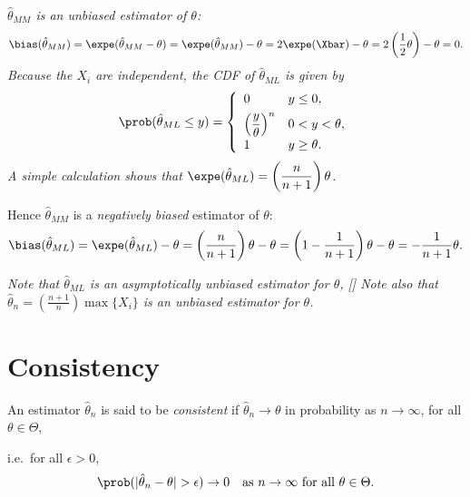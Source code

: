 \begin{solution}
\ben
\it $\hat{\theta}_{MM}$ is an \emph{unbiased} estimator of $\theta$:
\[
\bias(\hat{\theta}_{MM}) 
	= \expe(\hat{\theta}_{MM} - \theta)
	= \expe(\hat{\theta}_{MM}) - \theta
	= 2\expe(\Xbar) -\theta
	= 2\left(\frac{1}{2}\theta\right) - \theta
	= 0.
\]
\it Because the $X_i$ are independent, the CDF of $\hat{\theta}_{ML}$ is given by
\[
\prob(\hat{\theta}_{ML} \leq y) = \left\{\begin{array}{ll}
	0	& y \leq 0, \\[1ex]
	\displaystyle\left(\frac{y}{\theta}\right)^n & 0 < y < \theta, \\[1ex]
	1	& y \geq \theta.
\end{array}\right.
\]
A simple calculation shows that $\displaystyle\expe(\hat{\theta}_{ML}) = \left(\frac{n}{n+1}\right)\theta$.
\par
Hence $\hat{\theta}_{MM}$ is a \emph{negatively biased} estimator of $\theta$:
\[
\bias(\hat{\theta}_{ML}) 
	= \expe(\hat{\theta}_{ML}) - \theta
	= \left(\frac{n}{n+1}\right)\theta - \theta
	= \left(1-\frac{1}{n+1}\right)\theta - \theta
	= -\frac{1}{n+1}\theta.
\]

\bit
\it Note that $\hat{\theta}_{ML}$ is an \emph{asymptotically unbiased} estimator for $\theta$,
\it[]
\it Note also that $\hat{\theta}_n = \displaystyle\left(\frac{n+1}{n}\right)\max\{X_i\}$ is an unbiased estimator for $\theta$.
\eit
\een
\end{solution}




\section{Consistency}

\begin{definition}
An estimator $\hat{\theta}_n$ is said to be \emph{consistent} if $\hat{\theta}_n\to\theta$ in probability as $n\to\infty$, for all $\theta\in\Theta$, 
\par
i.e.\ for all $\epsilon>0$,
\[
\prob(|\hat{\theta}_n - \theta|>\epsilon)\to 0 \text{\quad as $n\to\infty$ for all $\theta\in\Theta$.} 
\]
\end{definition}

